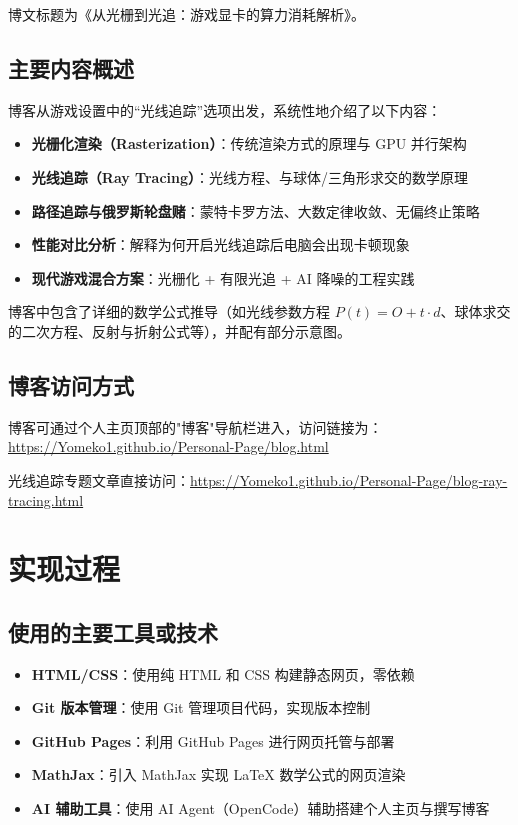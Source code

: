 \documentclass[UTF8]{article}
\begin{document}
博文标题为《从光栅到光追：游戏显卡的算力消耗解析》。

\subsection{主要内容概述}
博客从游戏设置中的“光线追踪”选项出发，系统性地介绍了以下内容：

\begin{itemize}
    \item \textbf{光栅化渲染（Rasterization）}：传统渲染方式的原理与 GPU 并行架构
    \item \textbf{光线追踪（Ray Tracing）}：光线方程、与球体/三角形求交的数学原理
    \item \textbf{路径追踪与俄罗斯轮盘赌}：蒙特卡罗方法、大数定律收敛、无偏终止策略
    \item \textbf{性能对比分析}：解释为何开启光线追踪后电脑会出现卡顿现象
    \item \textbf{现代游戏混合方案}：光栅化 + 有限光追 + AI 降噪的工程实践
\end{itemize}

博客中包含了详细的数学公式推导（如光线参数方程 \(P(t) = O + t \cdot d\)、球体求交的二次方程、反射与折射公式等），并配有部分示意图。

\subsection{博客访问方式}
博客可通过个人主页顶部的"博客"导航栏进入，访问链接为：\url{https://Yomeko1.github.io/Personal-Page/blog.html}

光线追踪专题文章直接访问：\url{https://Yomeko1.github.io/Personal-Page/blog-ray-tracing.html}

\section{实现过程}

\subsection{使用的主要工具或技术}

\begin{itemize}
    \item \textbf{HTML/CSS}：使用纯 HTML 和 CSS 构建静态网页，零依赖
    \item \textbf{Git 版本管理}：使用 Git 管理项目代码，实现版本控制
    \item \textbf{GitHub Pages}：利用 GitHub Pages 进行网页托管与部署
    \item \textbf{MathJax}：引入 MathJax 实现 LaTeX 数学公式的网页渲染
    \item \textbf{AI 辅助工具}：使用 AI Agent（OpenCode）辅助搭建个人主页与撰写博客
\end{itemize}
\end{document}
